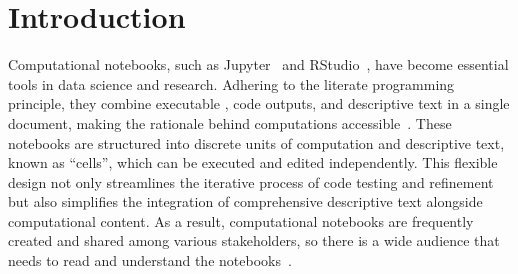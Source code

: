 
\section{Introduction}

Computational notebooks, such as Jupyter~\cite{jupyter} and RStudio~\cite{rstudio}, have become essential tools in data science and research.
Adhering to the literate programming principle, they combine executable , code outputs, and descriptive text in a single document, making the rationale behind computations accessible~\cite{knuth1984literate}.
These notebooks are structured into discrete units of computation and descriptive text, known as ``cells'', which can be executed and edited independently. 
This flexible design not only streamlines the iterative process of code testing and refinement but also simplifies the integration of comprehensive descriptive text alongside computational content.
As a result, computational notebooks are frequently created and shared among various stakeholders, so there is a wide audience that needs to read and understand the notebooks~\cite{ramasamy2023visualising}.

